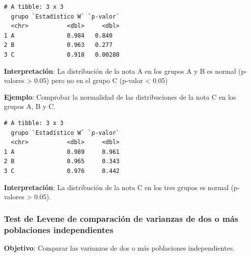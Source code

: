 \documentclass[
  a4paper,
]{scrreport}
\newenvironment{Shaded}{\begin{snugshade}}{\end{snugshade}}
\newcommand{\AttributeTok}[1]{\textcolor[rgb]{0.40,0.45,0.13}{#1}}
\newcommand{\FunctionTok}[1]{\textcolor[rgb]{0.28,0.35,0.67}{#1}}
\newcommand{\NormalTok}[1]{\textcolor[rgb]{0.00,0.23,0.31}{#1}}
\newcommand{\OtherTok}[1]{\textcolor[rgb]{0.00,0.23,0.31}{#1}}
\newcommand{\SpecialCharTok}[1]{\textcolor[rgb]{0.37,0.37,0.37}{#1}}
\newcommand{\StringTok}[1]{\textcolor[rgb]{0.13,0.47,0.30}{#1}}
\theoremstyle{definition}
\theoremstyle{definition}
\theoremstyle{remark}
\begin{document}
\begin{verbatim}
# A tibble: 3 x 3
  grupo `Estadístico W` `p-valor`
  <chr>           <dbl>     <dbl>
1 A               0.984   0.840  
2 B               0.963   0.277  
3 C               0.918   0.00280
\end{verbatim}

\textbf{Interpretación}: La distribución de la nota A en los grupos A y
B es normal (p-valores \textgreater{} 0.05) pero no en el grupo C
(p-valor \textless{} 0.05)

\textbf{Ejemplo}: Comprobar la normalidad de las distribuciones de la
nota C en los grupos A, B y C.

\begin{Shaded}
\end{Shaded}

\begin{verbatim}
# A tibble: 3 x 3
  grupo `Estadístico W` `p-valor`
  <chr>           <dbl>     <dbl>
1 A               0.989     0.961
2 B               0.965     0.343
3 C               0.976     0.442
\end{verbatim}

\textbf{Interpretación}: La distribución de la nota C en los tres grupos
es normal (p-valores \textgreater{} 0.05).

\hypertarget{test-de-levene-de-comparaciuxf3n-de-varianzas-de-dos-o-muxe1s-poblaciones-independientes}{%
\subsubsection{Test de Levene de comparación de varianzas de dos o más
poblaciones
independientes}\label{test-de-levene-de-comparaciuxf3n-de-varianzas-de-dos-o-muxe1s-poblaciones-independientes}}

\textbf{Objetivo}: Comparar las varianzas de dos o más poblaciones
independientes.
\end{document}
